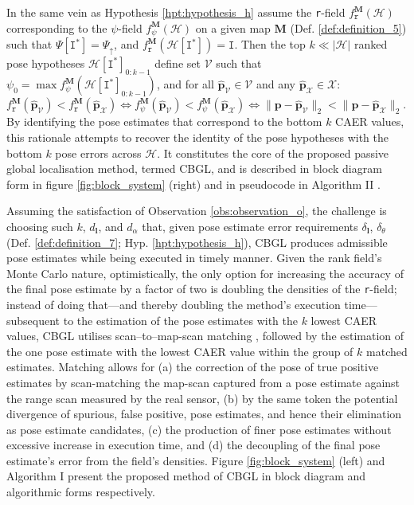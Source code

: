 In the same vein as Hypothesis \ref{hpt:hypothesis_h} assume the \texttt{r}-field
$f_{\texttt{r}}^{\bm{M}}(\mathcal{H})$ corresponding to the $\psi$-field
$f_{\psi}^{\bm{M}}(\mathcal{H})$ on a given map $\bm{M}$ (Def.
\ref{def:definition_5}) such that $\Psi[\texttt{I}^{\ast}] = \Psi_\uparrow$,
and $f_{\texttt{r}}^{\bm{M}}(\mathcal{H}[\texttt{I}^{\ast}]) = \texttt{I}$.
Then the top $k \ll |\mathcal{H}|$ ranked pose hypotheses
$\mathcal{H}[\texttt{I}^{\ast}]_{0:k-1}$ define set $\mathcal{V}$ such that
$\psi_0 = \max f_{\psi}^{\bm{M}}(\mathcal{H}[\texttt{I}^{\ast}]_{0:k-1})$,
and for all $\hat{\bm{p}}_\mathcal{V} \in \mathcal{V}$
and any $\hat{\bm{p}}_{\mathcal{X}} \in \mathcal{X}$:
$ f_{\texttt{r}}^{\bm{M}}(\hat{\bm{p}}_\mathcal{V}) < f_{\texttt{r}}^{\bm{M}}(\hat{\bm{p}}_{\mathcal{X}}) \Leftrightarrow
f_{\psi}^{\bm{M}}(\hat{\bm{p}}_\mathcal{V}) < f_{\psi}^{\bm{M}}(\hat{\bm{p}}_\mathcal{X}) \Leftrightarrow
\|\bm{p}-\hat{\bm{p}}_\mathcal{V}\|_2 < \|\bm{p}-\hat{\bm{p}}_{\mathcal{X}}\|_2$.
By identifying the pose estimates that correspond to the bottom $k$ CAER
values, this rationale attempts to recover the identity of the pose hypotheses
with the bottom $k$ pose errors across $\mathcal{H}$. It constitutes the core
of the proposed passive global localisation method, termed CBGL, and is
described in block diagram form in figure \ref{fig:block_system} (right) and in
pseudocode in Algorithm
II \cite{Filotheou2023c}.

Assuming the satisfaction of Observation \ref{obs:observation_o}, the challenge
is choosing such $k$, $d_{\bm{l}}$, and $d_\alpha$ that, given pose estimate
error requirements $\delta_{\bm{l}}$, $\delta_{\theta}$ (Def.
\ref{def:definition_7}; Hyp.  \ref{hpt:hypothesis_h}), CBGL produces admissible
pose estimates while being executed in timely manner.  Given the rank field's
Monte Carlo nature, optimistically, the only option for increasing the accuracy
of the final pose estimate by a factor of two is doubling the densities of the
\texttt{r}-field; instead of doing that---and thereby doubling the method's
execution time---subsequent to the estimation of the pose estimates with the
$k$ lowest CAER values, CBGL utilises scan--to--map-scan matching
\cite{Vasiljevic2016c,Filotheou2023a}, followed by the estimation of the one
pose estimate with the lowest CAER value within the group of $k$ matched
estimates.
Matching allows for (a) the correction of the pose of true positive estimates
by scan-matching the map-scan captured from a pose estimate against the range
scan measured by the real sensor, (b) by the same token the potential
divergence of spurious, false positive, pose estimates, and hence their
elimination as pose estimate candidates, (c) the production of finer pose
estimates without excessive increase in execution time, and (d) the decoupling
of the final pose estimate's error from the field's densities.
Figure \ref{fig:block_system} (left) and Algorithm
I \cite{Filotheou2023c} present the proposed method of CBGL in block diagram and
algorithmic forms respectively.

